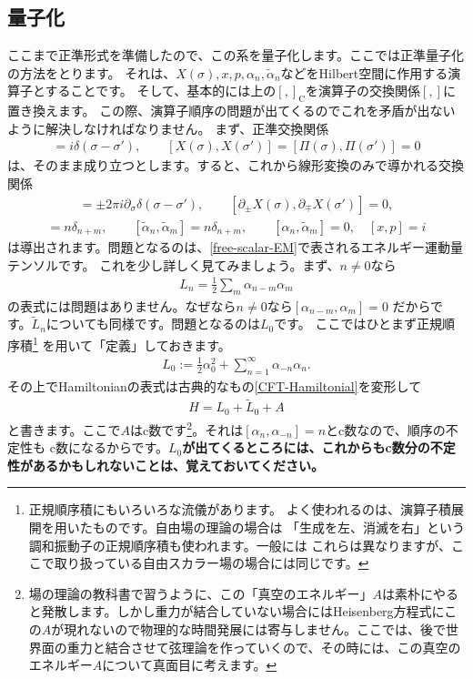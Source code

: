 \documentclass[report,paper=a4, fontsize=12pt, line_length=16cm, number_of_lines=34,dvipdfmx]{jlreq}
\numberwithin{equation}{chapter}
\numberwithin{equation}{section}
\newcommand{\del}{\partial}
\newcommand{\kyou}[1]{{\sffamily \bfseries #1}}
\newcommand{\alphat}{\tilde{\alpha}}
\newcommand{\Lt}{\widetilde{L}}
\newcommand{\cbk}[1]{[#1]_{\mathrm{C}}}
\begin{document}
\subsection{量子化}
ここまで正準形式を準備したので、この系を量子化します。ここでは正準量子化の方法をとります。
それは、$X(\sigma),x,p,\alpha_n,\alphat_n$などをHilbert空間に作用する演算子とすることです。
そして、基本的には上の$\cbk{,}$を演算子の交換関係$[,]$に置き換えます。
この際、演算子順序の問題が出てくるのでこれを矛盾が出ないように解決しなければなりません。
まず、正準交換関係
\begin{align}
[X(\sigma),\Pi(\sigma')]=i\delta(\sigma-\sigma'),\qquad
[X(\sigma),X(\sigma')]=
[\Pi(\sigma),\Pi(\sigma')]=0
\end{align}
は、そのまま成り立つとします。すると、これから線形変換のみで導かれる交換関係
\begin{align}
[\del_{\pm}X(\sigma),\del_{\pm}X(\sigma')]
=\pm 2\pi i \del_{\sigma}\delta(\sigma-\sigma'),\qquad
[\del_{\pm}X(\sigma),\del_{\mp}X(\sigma')]=0,
\end{align}
\begin{align}
[\alpha_{n},\alpha_{m}]=n\delta_{n+m},\qquad
[\alphat_{n},\alphat_{m}]=n\delta_{n+m},\qquad
[\alpha_{n},\alphat_{m}]=0,\quad
[x,p]=i
\end{align}
は導出されます。問題となるのは、\eqref{free-scalar-EM}で表されるエネルギー運動量テンソルです。
これを少し詳しく見てみましょう。まず、$n\ne 0$なら
\begin{align}
L_n=\frac12 \sum_m \alpha_{n-m}\alpha_{m}
\end{align}
の表式には問題はありません。なぜなら$n\ne 0$なら$[\alpha_{n-m},\alpha_{m}]=0$
だからです。$\Lt_n$についても同様です。問題となるのは$L_0$です。
ここではひとまず正規順序積\footnote{正規順序積にもいろいろな流儀があります。
よく使われるのは、演算子積展開を用いたものです。自由場の理論の場合は
「生成を左、消滅を右」という調和振動子の正規順序積も使われます。一般には
これらは異なりますが、ここで取り扱っている自由スカラー場の場合には同じです。}
を用いて「定義」しておきます。
\begin{align}
L_0:=\frac12 \alpha_0^2+\sum_{n=1}^{\infty}\alpha_{-n}\alpha_{n}.
\end{align}
その上でHamiltonianの表式は古典的なもの\eqref{CFT-Hamiltonial}を変形して
\begin{align}
H=L_0+\Lt_0+A
\end{align}
と書きます。ここで$A$はc数です\footnote{場の理論の教科書で習うように、この「真空のエネルギー」$A$は素朴にやると発散します。しかし重力が結合していない場合にはHeisenberg方程式にこの$A$が現れないので物理的な時間発展には寄与しません。ここでは、後で世界面の重力と結合させて弦理論を作っていくので、その時には、この真空のエネルギー$A$について真面目に考えます。}。それは$[\alpha_n,\alpha_{-n}]=n$とc数なので、順序の不定性も
c数になるからです。\kyou{$L_0$が出てくるところには、これからもc数分の不定性があるかもしれないことは、覚えておいてください。}
\end{document}
